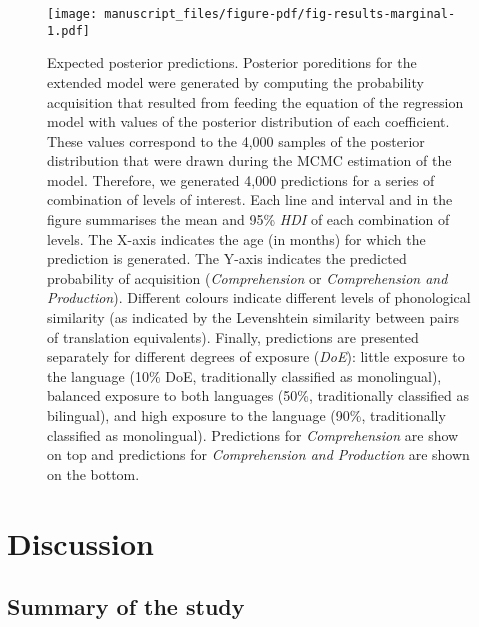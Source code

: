 \documentclass[
  letterpaper,
  DIV=11,
  numbers=noendperiod]{scrartcl}
\begin{document}
\begin{figure}

{\centering \texttt{[image: manuscript\_files/figure-pdf/fig-results-marginal-1.pdf]}

}

\caption{\label{fig-results-marginal}Expected posterior predictions.
Posterior poreditions for the extended model were generated by computing
the probability acquisition that resulted from feeding the equation of
the regression model with values of the posterior distribution of each
coefficient. These values correspond to the 4,000 samples of the
posterior distribution that were drawn during the MCMC estimation of the
model. Therefore, we generated 4,000 predictions for a series of
combination of levels of interest. Each line and interval and in the
figure summarises the mean and 95\% \emph{HDI} of each combination of
levels. The X-axis indicates the age (in months) for which the
prediction is generated. The Y-axis indicates the predicted probability
of acquisition (\emph{Comprehension} or \emph{Comprehension and
Production}). Different colours indicate different levels of
phonological similarity (as indicated by the Levenshtein similarity
between pairs of translation equivalents). Finally, predictions are
presented separately for different degrees of exposure (\emph{DoE}):
little exposure to the language (10\% DoE, traditionally classified as
monolingual), balanced exposure to both languages (50\%, traditionally
classified as bilingual), and high exposure to the language (90\%,
traditionally classified as monolingual). Predictions for
\emph{Comprehension} are show on top and predictions for
\emph{Comprehension and Production} are shown on the bottom.}

\end{figure}

\hypertarget{sec-discussion}{%
\section{Discussion}\label{sec-discussion}}

\hypertarget{summary-of-the-study}{%
\subsection{Summary of the study}\label{summary-of-the-study}}
\end{document}

